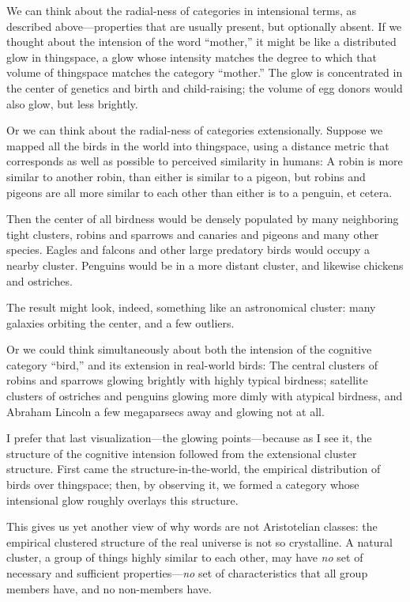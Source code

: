 { We can think about the radial-ness of categories in intensional
terms, as described above---properties that are usually present, but
optionally absent. If we thought about the intension of the word
``mother,'' it might be like a
distributed glow in thingspace, a glow whose intensity matches the
degree to which that volume of thingspace matches the category
``mother.'' The glow is concentrated
in the center of genetics and birth and child-raising; the volume of
egg donors would also glow, but less brightly.


 Or we can think about the radial-ness of categories extensionally.
Suppose we mapped all the birds in the world into thingspace, using a
distance metric that corresponds as well as possible to perceived
similarity in humans: A robin is more similar to another robin, than
either is similar to a pigeon, but robins and pigeons are all more
similar to each other than either is to a penguin, et cetera.


 Then the center of all birdness would be densely populated by many
neighboring tight clusters, robins and sparrows and canaries and
pigeons and many other species. Eagles and falcons and other large
predatory birds would occupy a nearby cluster. Penguins would be in a
more distant cluster, and likewise chickens and ostriches.


 The result might look, indeed, something like an astronomical
cluster: many galaxies orbiting the center, and a few outliers.


 Or we could think simultaneously about both the intension of the
cognitive category ``bird,'' and its
extension in real-world birds: The central clusters of robins and
sparrows glowing brightly with highly typical birdness; satellite
clusters of ostriches and penguins glowing more dimly with atypical
birdness, and Abraham Lincoln a few megaparsecs away and glowing not at
all.


 I prefer that last visualization---the glowing points---because as
I see it, the structure of the cognitive intension followed from the
extensional cluster structure. First came the structure-in-the-world,
the empirical distribution of birds over thingspace; then, by observing
it, we formed a category whose intensional glow roughly overlays this
structure.


 This gives us yet another view of why words are not Aristotelian
classes: the empirical clustered structure of the real universe is not
so crystalline. A natural cluster, a group of things highly similar to
each other, may have \textit{no} set of necessary and sufficient
properties---\textit{no} set of characteristics that all group members
have, and no non-members have.


}
